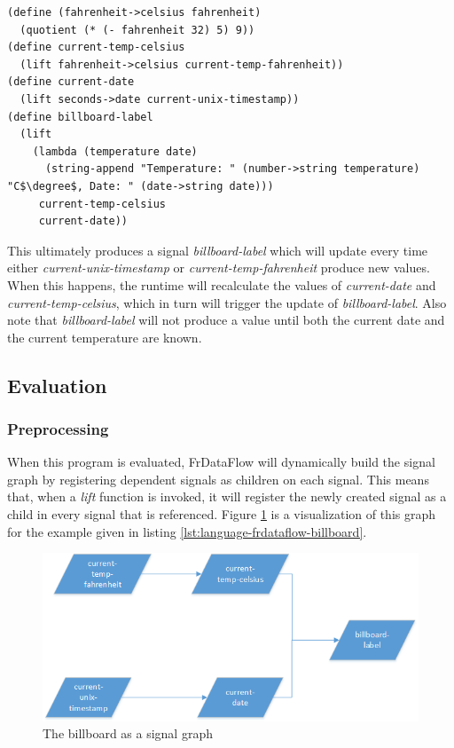 \begin{lstlisting}[caption={Billboard},captionpos=b,label={lst:language-frdataflow-billboard},mathescape,language=FrDataFlow]
(define (fahrenheit->celsius fahrenheit)
  (quotient (* (- fahrenheit 32) 5) 9))
(define current-temp-celsius
  (lift fahrenheit->celsius current-temp-fahrenheit))
(define current-date
  (lift seconds->date current-unix-timestamp))
(define billboard-label
  (lift
    (lambda (temperature date)
      (string-append "Temperature: " (number->string temperature) "C$\degree$, Date: " (date->string date)))
     current-temp-celsius
     current-date))   
\end{lstlisting}
This ultimately produces a signal \textit{billboard-label} which will update every time either \textit{current-unix-timestamp} or \textit{current-temp-fahrenheit} produce new values. When this happens, the runtime will recalculate the values of \textit{current-date} and \textit{current-temp-celsius}, which in turn will trigger the update of \textit{billboard-label}. Also note that \textit{billboard-label} will not produce a value until both the current date and the current temperature are known. 

\subsection{Evaluation}

\subsubsection{Preprocessing}

When this program is evaluated, FrDataFlow will dynamically build the signal graph by registering dependent signals as children on each signal. This means that, when a \textit{lift} function is invoked, it will register the newly created signal as a child in every signal that is referenced. Figure \ref{fig:language-frdataflow-example} is a visualization of this graph for the example given in listing \ref{lst:language-frdataflow-billboard}.

\begin{figure}[h]
	\centerline{\includegraphics[width=\textwidth]{images/Language-FrDataflow-Example.png}}
	\caption{The billboard as a signal graph}
	\label{fig:language-frdataflow-example}
\end{figure}

